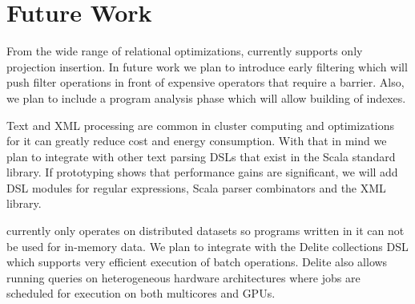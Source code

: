 \section{Future Work}
\label{sec:future-work}

From the wide range of relational optimizations, \tool currently supports only
 projection insertion. In future work we plan to introduce early filtering
 which will push filter operations in front of expensive operators that
 require a barrier. Also, we plan to include a program analysis phase which will
 allow building of indexes.

Text and XML processing are common in cluster computing and optimizations for it
can greatly reduce cost and energy consumption. With that in mind we plan to
integrate \tool with other text parsing DSLs that exist in the Scala standard
library. If prototyping shows that performance gains are significant, we will
add DSL modules for regular expressions, Scala parser combinators and the XML
library.

\tool currently only operates on distributed datasets so programs written in it
can not be used for in-memory data. We plan to integrate \tool with the Delite
\cite{brown_heterogeneous_2011} collections DSL which supports very efficient
execution of batch operations. Delite also allows running queries on
heterogeneous hardware architectures where jobs are scheduled for execution on
both multicores and GPUs.
\\
